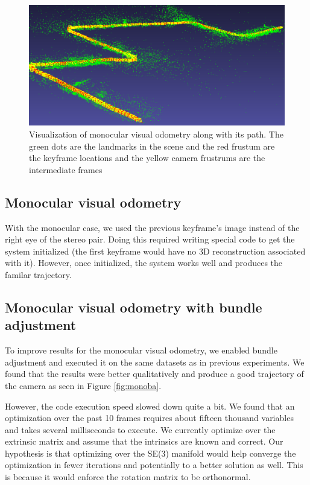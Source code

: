 \documentclass{article}
\begin{document}
\begin{figure}
\includegraphics[width=\textwidth]{./path}
\caption{Visualization of monocular visual odometry along with its path. The green dots are the landmarks in the scene and the red frustum are the keyframe locations and the yellow camera frustrums are the intermediate frames}
\label{fig:closeup}
\end{figure}

\subsection{Monocular visual odometry}
With the monocular case, we used the previous keyframe's image instead of the right eye of the stereo pair. Doing this required writing special code to get the system initialized (the first keyframe would have no 3D reconstruction associated with it). However, once initialized, the system works well and produces the familar trajectory.

\subsection{Monocular visual odometry with bundle adjustment}
To improve results for the monocular visual odometry, we enabled bundle adjustment and executed it on the same datasets as in previous experiments. We found that the results were better qualitatively and produce a good trajectory of the camera as seen in Figure \ref{fig:monoba}.

However, the code execution speed slowed down quite a bit. We found that an optimization over the past 10 frames requires about fifteen thousand variables and takes several milliseconds to execute. We currently optimize over the extrinsic matrix and assume that the intrinsics are known and correct. Our hypothesis is that optimizing over the SE(3) manifold would help converge the optimization in fewer iterations and potentially to a better solution as well. This is because it would enforce the rotation matrix to be orthonormal.
\end{document}
